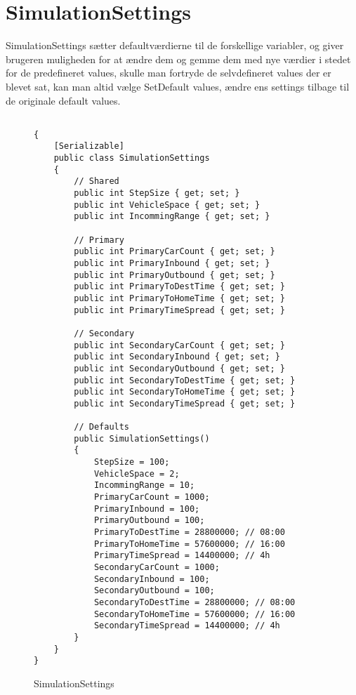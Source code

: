 \section{SimulationSettings}

SimulationSettings sætter defaultværdierne til de forskellige variabler, og giver brugeren muligheden for at ændre dem og gemme dem med nye værdier i stedet for de predefineret values, skulle man fortryde de selvdefineret values der er blevet sat, kan man altid vælge SetDefault values, ændre ens settings tilbage til de originale default values.

\begin{figure}[H]
\begin{lstlisting} 

{
    [Serializable]
    public class SimulationSettings
    {
        // Shared
        public int StepSize { get; set; }
        public int VehicleSpace { get; set; }
        public int IncommingRange { get; set; }

        // Primary
        public int PrimaryCarCount { get; set; }
        public int PrimaryInbound { get; set; }
        public int PrimaryOutbound { get; set; }
        public int PrimaryToDestTime { get; set; }
        public int PrimaryToHomeTime { get; set; }
        public int PrimaryTimeSpread { get; set; }

        // Secondary
        public int SecondaryCarCount { get; set; }
        public int SecondaryInbound { get; set; }
        public int SecondaryOutbound { get; set; }
        public int SecondaryToDestTime { get; set; }
        public int SecondaryToHomeTime { get; set; }
        public int SecondaryTimeSpread { get; set; }

        // Defaults
        public SimulationSettings()
        {
            StepSize = 100;
            VehicleSpace = 2;
            IncommingRange = 10;
            PrimaryCarCount = 1000;
            PrimaryInbound = 100;
            PrimaryOutbound = 100;
            PrimaryToDestTime = 28800000; // 08:00
            PrimaryToHomeTime = 57600000; // 16:00
            PrimaryTimeSpread = 14400000; // 4h
            SecondaryCarCount = 1000;
            SecondaryInbound = 100;
            SecondaryOutbound = 100;
            SecondaryToDestTime = 28800000; // 08:00
            SecondaryToHomeTime = 57600000; // 16:00
            SecondaryTimeSpread = 14400000; // 4h
        }
    }
}
\end{lstlisting}
\caption{SimulationSettings}\label{SimulationSettings}
\end{figure}

